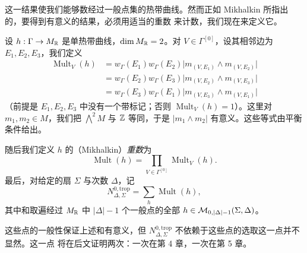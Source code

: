 
这一结果使我们能够数经过一般点集的热带曲线。然而正如 Mikhalkin 所指出的，要得到有意义的结果，必须用适当的重数
来计数，我们现在来定义它。

\begin{definition}
设 $h : \Gamma \to M_{\mathbb{R}}$ 是单热带曲线，$\dim M_{\mathbb{R}} = 2$。对 $V \in \Gamma^{[0]}$，设其相邻边为
$E_1, E_2, E_3$，我们定义
\begin{align*}
\operatorname{Mult}_V(h) &= w_\Gamma(E_1)w_\Gamma(E_2)\bigl|m_{(V,E_1)} \wedge m_{(V,E_2)}\bigr| \\
&= w_\Gamma(E_2)w_\Gamma(E_3)\bigl|m_{(V,E_2)} \wedge m_{(V,E_3)}\bigr| \\
&= w_\Gamma(E_3)w_\Gamma(E_1)\bigl|m_{(V,E_3)} \wedge m_{(V,E_1)}\bigr|
\end{align*}
（前提是 $E_1,E_2,E_3$ 中没有一个带标记；否则 $\operatorname{Mult}_V(h) = 1$）。这里对 $m_1, m_2 \in M$，我们把
$\bigwedge^2 M$ 与 $\mathbb{Z}$ 等同，于是 $|m_1 \wedge m_2|$ 有意义。这些等式由平衡条件给出。

随后我们定义 $h$ 的（Mikhalkin）\emph{重数}为
\[
\operatorname{Mult}(h) = \prod_{V\in\Gamma^{[0]}} \operatorname{Mult}_V(h).
\]
最后，对给定的扇 $\Sigma$ 与次数 $\Delta$，记
\[
N^{0,\mathrm{trop}}_{\Delta,\Sigma} = \sum_h \operatorname{Mult}(h),
\]
其中和取遍经过 $M_{\mathbb{R}}$ 中 $|\Delta|-1$ 个一般点的全部 $h \in \mathcal{M}_{0,|\Delta|-1}(\Sigma,\Delta)$。
\end{definition}


这些点的一般性保证上述和有意义，但 $N^{0,\mathrm{trop}}_{\Delta,\Sigma}$ 不依赖于这些点的选取这一点并不显然。这一点
将在后文证明两次：一次在第 4 章，一次在第 5 章。

